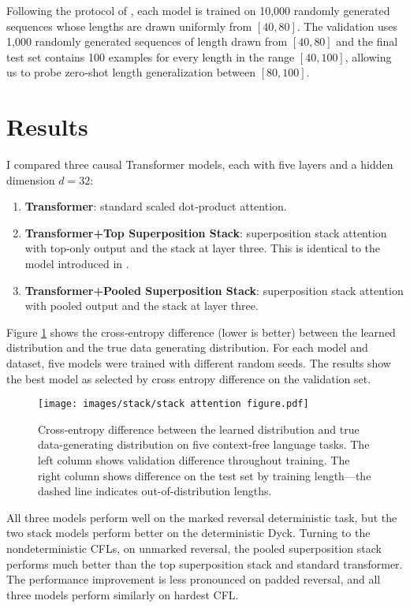 Following the protocol of \citet{dusell2024stack}, each model is trained on 10,000 randomly generated sequences whose lengths are drawn uniformly from $[40,80]$. The validation uses 1,000 randomly generated sequences of length drawn from $[40,80]$ and the final test set contains 100 examples for every length in the range $[40,100]$, allowing us to probe zero‑shot length generalization between $[80,100]$.


\section{Results} \label{sec:stack-results}
I compared three causal Transformer models, each with five layers and a hidden dimension $d=32$:
\begin{enumerate}
    \item \textbf{Transformer}: standard scaled dot‑product attention.
    \item \textbf{Transformer+Top Superposition Stack}: superposition stack attention with top‑only output and the stack at layer three. This is identical to the model introduced in \citet{dusell2024stack}.
    \item \textbf{Transformer+Pooled Superposition Stack}: superposition stack attention with pooled output and the stack at layer three.
\end{enumerate}

Figure \ref{fig:stack-results} shows the cross‑entropy difference (lower is better) between the learned distribution and the true data generating distribution. For each model and dataset, five models were trained with different random seeds. The results show the best model as selected by cross entropy difference on the validation set. 

\begin{figure}[h]
    \centering
    \vspace{-1em}
    \texttt{[image: images/stack/stack attention figure.pdf]}
    \caption{Cross-entropy difference between the learned distribution and true data-generating distribution on five context-free language tasks. The left column shows validation difference throughout training. The right column shows difference on the test set by training length—the dashed line indicates out-of-distribution lengths.}
    \label{fig:stack-results}
\end{figure}

All three models perform well on the marked reversal deterministic task, but the two stack models perform better on the deterministic Dyck. Turning to the nondeterministic CFLs, on unmarked reversal, the pooled superposition stack performs much better than the top superposition stack and standard transformer. The performance improvement is less pronounced on padded reversal, and all three models perform similarly on hardest CFL.


